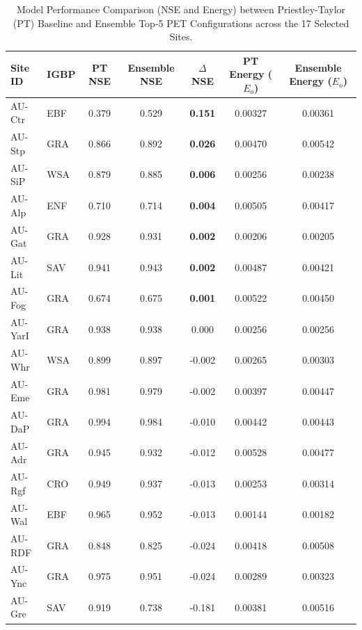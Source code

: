 \documentclass[11pt,a4paper]{article}
\begin{document}
\begin{table}[H]
\centering
\caption{Model Performance Comparison (NSE and Energy) between Priestley-Taylor (PT) Baseline and Ensemble Top-5 PET Configurations across the 17 Selected Sites.}
\label{tab:perf_comp}
\begin{tabular}{llccccc}
\toprule
Site ID & IGBP & PT NSE & Ensemble NSE & $\Delta$ NSE & PT Energy ($E_o$) & Ensemble Energy ($E_o$) \\
\midrule
AU-Ctr & EBF & 0.379 & 0.529 & \textbf{0.151} & 0.00327 & 0.00361 \\
AU-Stp & GRA & 0.866 & 0.892 & \textbf{0.026} & 0.00470 & 0.00542 \\
AU-SiP & WSA & 0.879 & 0.885 & \textbf{0.006} & 0.00256 & 0.00238 \\
AU-Alp & ENF & 0.710 & 0.714 & \textbf{0.004} & 0.00505 & 0.00417 \\
AU-Gat & GRA & 0.928 & 0.931 & \textbf{0.002} & 0.00206 & 0.00205 \\
AU-Lit & SAV & 0.941 & 0.943 & \textbf{0.002} & 0.00487 & 0.00421 \\
AU-Fog & GRA & 0.674 & 0.675 & \textbf{0.001} & 0.00522 & 0.00450 \\
AU-YarI & GRA & 0.938 & 0.938 & 0.000 & 0.00256 & 0.00256 \\
AU-Whr & WSA & 0.899 & 0.897 & -0.002 & 0.00265 & 0.00303 \\
AU-Eme & GRA & 0.981 & 0.979 & -0.002 & 0.00397 & 0.00447 \\
AU-DaP & GRA & 0.994 & 0.984 & -0.010 & 0.00442 & 0.00443 \\
AU-Adr & GRA & 0.945 & 0.932 & -0.012 & 0.00528 & 0.00477 \\
AU-Rgf & CRO & 0.949 & 0.937 & -0.013 & 0.00253 & 0.00314 \\
AU-Wal & EBF & 0.965 & 0.952 & -0.013 & 0.00144 & 0.00182 \\
AU-RDF & GRA & 0.848 & 0.825 & -0.024 & 0.00418 & 0.00508 \\
AU-Ync & GRA & 0.975 & 0.951 & -0.024 & 0.00289 & 0.00323 \\
AU-Gre & SAV & 0.919 & 0.738 & -0.181 & 0.00381 & 0.00516 \\
\bottomrule
\end{tabular}
\end{table}
\end{document}
